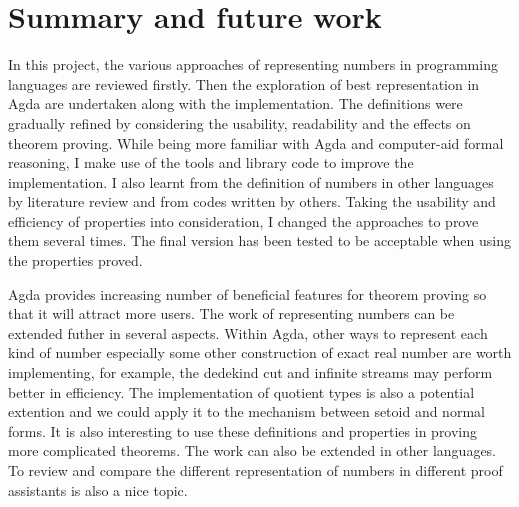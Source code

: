 \documentclass{article}
\theoremstyle{definition}
\begin{document}
\section{Summary and future work}

In this project, the various approaches of representing numbers in programming languages are reviewed firstly. Then the exploration of best representation in Agda are undertaken along with the implementation. The definitions were gradually refined by considering the usability, readability and the effects on theorem proving. While being more familiar with Agda and computer-aid formal reasoning, I make use of the tools and library code to improve the implementation. I also learnt from the definition of numbers in other languages by literature review and from codes written by others. Taking the usability and efficiency of properties into consideration, I changed the approaches to prove them several times. The final version has been tested to be acceptable when using the properties proved.

Agda provides increasing number of beneficial features for theorem proving so that it will attract more users. The work of representing numbers can be extended futher in several aspects. Within Agda, other ways to represent each kind of number especially some other construction of exact real number are worth implementing, for example, the dedekind cut and infinite streams may perform better in efficiency. The implementation of quotient types is also a potential extention and we could apply it to the mechanism between setoid and normal forms. It is also interesting to use these definitions and properties in proving more complicated theorems. The work can also be extended in other languages. To review and compare the different representation of numbers in different proof assistants is also a nice topic. 

\newpage


\end{document}
